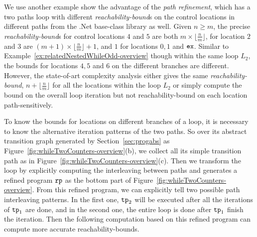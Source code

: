 \begin{example}
  \label{ex:twoCounterWhile}
  We use another example show the advantage of the \emph{path refinement}, which has a two paths loop
  with different \emph{reachability-bound}s on the control locations in different paths from the .Net base-class library as well.
Given $n \geq m$,
the precise \emph{reachability-bound}s for control locations $4$ and $5$ are both $m \times \lfloor\frac{n}{m}\rfloor$,
for location $2$ and $3$ are $(m + 1) \times \lfloor\frac{n}{m}\rfloor + 1$, 
and $1$ for locations $0, 1$ and $\mathtt{ex}$. 
{Similar to Example~\ref{ex:relatedNestedWhileOdd-overview} though within the same loop $L_2$, the bounds for locations $4, 5$ and $6$ on the different branches are different.}
However, the state-of-art complexity analysis either
gives the same \emph{reachability-bound}, $n + \lfloor\frac{n}{m}\rfloor$ for all the locations within the loop $L_2$
or simply compute the bound on the overall loop iteration but not reachability-bound on each location path-sensitively.

To know the bounds for locations on different branches of a loop, 
it is necessary to know the alternative iteration patterns of the two paths.
So over its abstract transition graph generated by Section~\ref{sec:progabs} as Figure~\ref{fig:whileTwoCounters-overview}(b), we collect all its simple transition path as in Figure~\ref{fig:whileTwoCounters-overview}(c).
Then we transform the loop by explicitly computing the interleaving between paths and
generates a refined program $\mathtt{rp}$ as the bottom part of Figure~\ref{fig:whileTwoCounters-overview}.
From this refined program, we can explicitly tell two possible path interleaving patterns.
In the first one, $\mathtt{tp}_2$ will be executed after all the iterations of $\mathtt{tp}_1$ are done, and in the second one,
the entire loop is done after $\mathtt{tp}_1$ finish the iteration.
Then the following computation based on this refined program can compute more accurate reachability-bounds.
\end{example}
